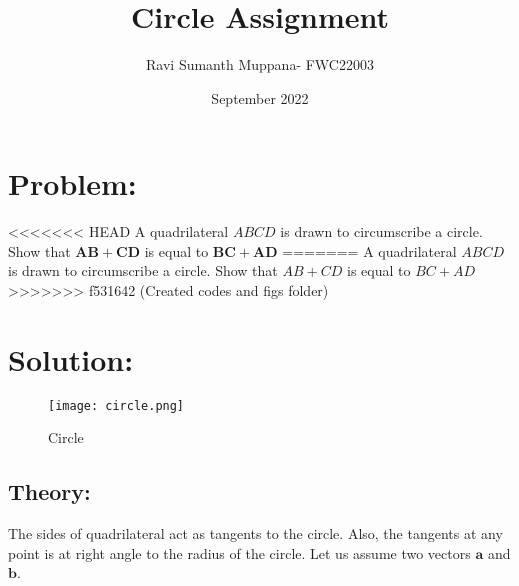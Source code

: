 \documentclass[a4paper,12pt,twocolumn]{article}
\title{Circle Assignment}
\author{Ravi Sumanth Muppana- FWC22003}
\date{September 2022}
\let\vec\mathbf
\begin{document}
\maketitle
\section{Problem:}
<<<<<<< HEAD
A quadrilateral $ABCD$ is drawn to circumscribe a circle. Show that $\vec{AB+CD}$ is equal to $\vec{BC+AD}$
=======
A quadrilateral $ABCD$ is drawn to circumscribe a circle. Show that $AB+CD$ is equal to $BC+AD$
>>>>>>> f531642 (Created codes and figs folder)
\maketitle
\section{Solution:}
\begin{figure}[h]
	\texttt{[image: circle.png]}
	\caption{Circle}
\end{figure}
\subsection{Theory:}
The sides of quadrilateral act as tangents to the circle. Also, the tangents at any point is at right angle to the radius of the circle. Let us assume two vectors $\vec{a}$ and $\vec{b}$.
\end{document}
